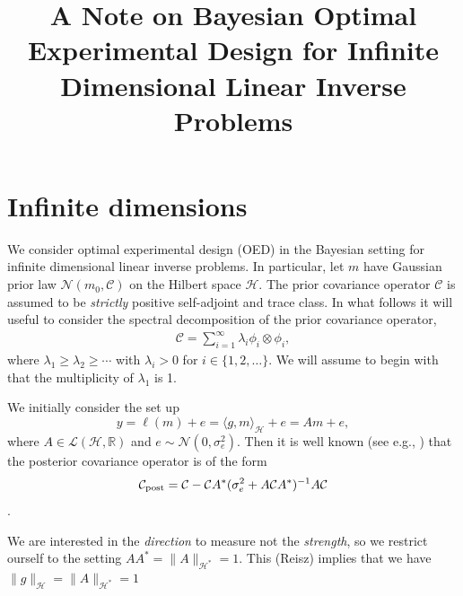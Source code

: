 \documentclass[pdflatex,sn-mathphys-num]{sn-jnl}
\theoremstyle{thmstyleone}%
\theoremstyle{thmstyletwo}%
\theoremstyle{thmstylethree}%
\begin{document}
\title[]{A Note on Bayesian Optimal Experimental Design for Infinite Dimensional Linear Inverse Problems}

\author*[1,2]{ }

\author[2,3]{ }



\maketitle

\section{Infinite dimensions}\label{sec1}

We consider optimal experimental design (OED) in the Bayesian setting for infinite dimensional linear inverse problems. In particular, let $m$ have Gaussian prior law $\mathcal{N}(m_0,\mathcal{C})$ on the Hilbert space $\mathcal{H}$. The prior covariance operator $\mathcal{C}$ is assumed to be {\em strictly} positive self-adjoint and trace class. In what follows it will useful to consider the spectral decomposition of the prior covariance operator,
\begin{align}
    \mathcal{C}=\sum_{i=1}^\infty\lambda_i\phi_i\otimes\phi_i,\label{eq:KLexp}
\end{align}
where $\lambda_1\geq \lambda_2\geq\cdots$ with $\lambda_i>0$ for $i\in\{1,2,\dots\}.$ We will assume to begin with that the multiplicity of $\lambda_1$ is 1.

We initially consider the set up 
\[y=\ell(m)+e=\langle g,m\rangle_\mathcal{H} + e=Am+e,\]
where $A\in\mathcal{L}(\mathcal{H},\mathbb{R})$ and $e\sim\mathcal{N}(0,\sigma^2_e).$ Then it is well known (see e.g., \cite[Equation (3.4b)]{stuart2010inverse}) that the posterior covariance operator is of the form
\[\mathcal{C}_{\rm post}=\mathcal{C}-\mathcal{C}A^\ast(\sigma_e^2+A\mathcal{C}A^\ast)^{-1}A\mathcal{C}\].

We are interested in the {\em direction} to measure not the {\em strength}, so we restrict ourself to the setting $AA^\ast=\|A\|_{\mathcal{H}^\ast}=1$. This (Reisz) implies that we have $\|g\|_\mathcal{H}=\|A\|_{\mathcal{H}^\ast}=1$
\end{document}
